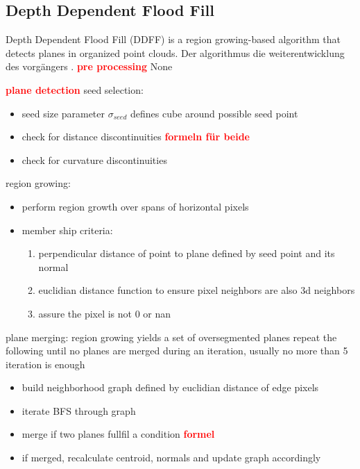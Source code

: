 \documentclass[main.tex]{subfiles}
\begin{document}
\subsection{Depth Dependent Flood Fill}
Depth Dependent Flood Fill (DDFF) is a region growing-based algorithm that detects planes in organized point clouds. 
Der algorithmus die weiterentwicklung des vorgängers \cite{Roychoudhury_Missura_Bennewitz_2021}.
\textbf{\textcolor{red}{pre processing}}
None

\textbf{\textcolor{red}{plane detection}}
seed selection:

\begin{itemize}
    \item seed size parameter $\sigma_{seed}$ defines cube around possible seed point
    \item check for distance discontinuities  \textbf{\textcolor{red}{formeln für beide}}
    \item check for curvature discontinuities
\end{itemize}

region growing:
\begin{itemize}
    \item perform region growth over spans of horizontal pixels 
    \item member ship criteria:
    \begin{enumerate}
        \item perpendicular distance of point to plane defined by seed point and its normal
        \item euclidian distance function to ensure pixel neighbors are also 3d neighbors
        \item assure the pixel is not 0 or nan
    \end{enumerate}
\end{itemize}

plane merging:
region growing yields a set of oversegmented planes
repeat the following until no planes are merged during an iteration, usually no more than 5 iteration is enough
\begin{itemize}
    \item build neighborhood graph defined by euclidian distance of edge pixels
    \item iterate BFS through graph
    \item merge if two planes fullfil a condition \textbf{\textcolor{red}{formel}}
    \item if merged, recalculate centroid, normals and update graph accordingly
\end{itemize}
\end{document}
